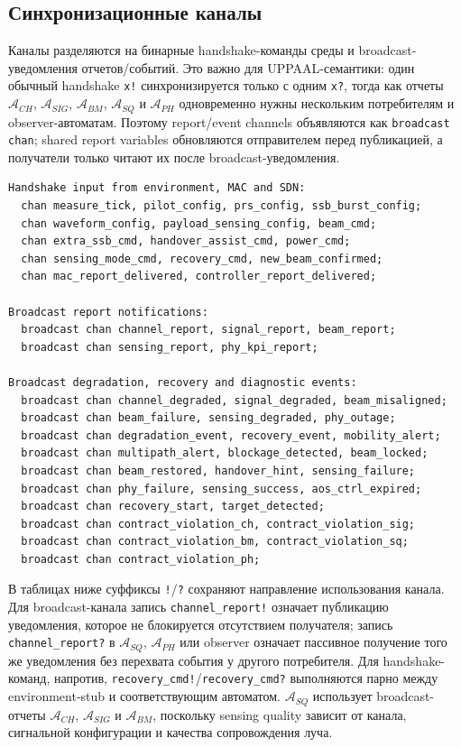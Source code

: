 \documentclass[10pt,a4paper]{article}
\newcommand{\code}[1]{\texttt{#1}}
\newcommand{\A}[1]{\mathcal{A}_{#1}}
\begin{document}
\subsection{Синхронизационные каналы}

Каналы разделяются на бинарные handshake-команды среды и broadcast-уведомления отчетов/событий. Это важно для UPPAAL-семантики: один обычный handshake \code{x!} синхронизируется только с одним \code{x?}, тогда как отчеты \(\A{CH}\), \(\A{SIG}\), \(\A{BM}\), \(\A{SQ}\) и \(\A{PH}\) одновременно нужны нескольким потребителям и observer-автоматам. Поэтому report/event channels объявляются как \code{broadcast chan}; shared report variables обновляются отправителем перед публикацией, а получатели только читают их после broadcast-уведомления.
\begin{verbatim}
Handshake input from environment, MAC and SDN:
  chan measure_tick, pilot_config, prs_config, ssb_burst_config;
  chan waveform_config, payload_sensing_config, beam_cmd;
  chan extra_ssb_cmd, handover_assist_cmd, power_cmd;
  chan sensing_mode_cmd, recovery_cmd, new_beam_confirmed;
  chan mac_report_delivered, controller_report_delivered;

Broadcast report notifications:
  broadcast chan channel_report, signal_report, beam_report;
  broadcast chan sensing_report, phy_kpi_report;

Broadcast degradation, recovery and diagnostic events:
  broadcast chan channel_degraded, signal_degraded, beam_misaligned;
  broadcast chan beam_failure, sensing_degraded, phy_outage;
  broadcast chan degradation_event, recovery_event, mobility_alert;
  broadcast chan multipath_alert, blockage_detected, beam_locked;
  broadcast chan beam_restored, handover_hint, sensing_failure;
  broadcast chan phy_failure, sensing_success, aos_ctrl_expired;
  broadcast chan recovery_start, target_detected;
  broadcast chan contract_violation_ch, contract_violation_sig;
  broadcast chan contract_violation_bm, contract_violation_sq;
  broadcast chan contract_violation_ph;
\end{verbatim}

В таблицах ниже суффиксы \code{!}/\code{?} сохраняют направление использования канала. Для broadcast-канала запись \code{channel\_report!} означает публикацию уведомления, которое не блокируется отсутствием получателя; запись \code{channel\_report?} в \(\A{SQ}\), \(\A{PH}\) или observer означает пассивное получение того же уведомления без перехвата события у другого потребителя. Для handshake-команд, напротив, \code{recovery\_cmd!}/\code{recovery\_cmd?} выполняются парно между environment-stub и соответствующим автоматом. \(\A{SQ}\) использует broadcast-отчеты \(\A{CH}\), \(\A{SIG}\) и \(\A{BM}\), поскольку sensing quality зависит от канала, сигнальной конфигурации и качества сопровождения луча.
\end{document}
